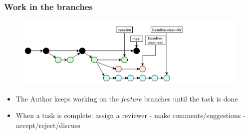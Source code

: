 \documentclass[aspectratio=169]{beamer} %
\begin{document}
\begin{frame}
	\frametitle{Work in the branches}

	\vspace{-.5cm}
	\begin{minipage}[t][5cm][t]{\textwidth}
		\begin{figure}
			\centering
			\includegraphics[width=\textwidth]{./img/dime-gitflow-network-2-3.png}
		\end{figure}
	\end{minipage}

	\vspace{-.5cm}
	\begin{minipage}[t][5cm][t]{\textwidth}
		\begin{itemize}
			\setlength\itemsep{.5em}
			\item The Author keeps working on the \textit{feature} branches until
			the task is done
			\item When a task is complete: assign a reviewer
			- make comments/suggestions - accept/reject/discuss
		\end{itemize}
	\end{minipage}
\end{frame}
\end{document}
